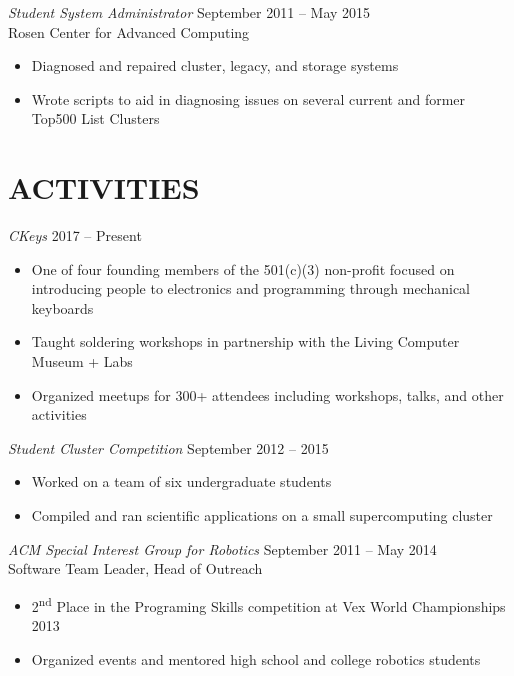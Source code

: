 \documentclass[line,margin]{res}
\begin{document}
\begin{resume}
    {\sl Student System Administrator\/} \hfill September 2011 -- May 2015 \\%
      Rosen Center for Advanced Computing
      \begin{itemize}
	\setlength{\itemsep}{-2pt}
        \item Diagnosed and repaired cluster, legacy, and storage systems
        \item Wrote scripts to aid in diagnosing issues on several current and former Top500 List Clusters
      \end{itemize}

  \section{\textcolor{TealBlue}{ACTIVITIES}}
    {\sl CKeys\/} \hfill 2017 -- Present %
      \begin{itemize}
	\setlength{\itemsep}{-2pt}
        \item One of four founding members of the 501(c)(3) non-profit focused on introducing people to electronics and programming through mechanical keyboards %
        \item Taught soldering workshops in partnership with the Living Computer Museum + Labs
        \item Organized meetups for 300+ attendees including workshops, talks, and other activities
      \end{itemize}

    {\sl Student Cluster Competition\/} \hfill September 2012 -- 2015 %
      \begin{itemize}
	\setlength{\itemsep}{-2pt}
        \item Worked on a team of six undergraduate students
        \item Compiled and ran scientific applications on a small supercomputing cluster
      \end{itemize}
  
    {\sl ACM Special Interest Group for Robotics\/} \hfill September 2011 -- May 2014 \\%
      Software Team Leader, Head of Outreach
      \begin{itemize}
	\setlength{\itemsep}{-2pt}
        \item 2\textsuperscript{nd} Place in the Programing Skills competition at Vex World Championships 2013
        \item Organized events and mentored high school and college robotics students
      \end{itemize}
    

\end{resume}
\end{document}
